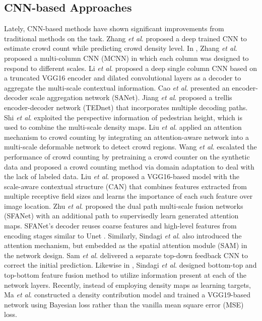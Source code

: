 \documentclass[10pt, conference, a4paper]{IEEEtran}
\begin{document}
\subsection{CNN-based Approaches}
Lately, CNN-based methods have shown significant improvements from traditional methods on the task. Zhang \textit{et al}. \cite{zhang2015cross} proposed a deep trained CNN to estimate crowd count while predicting crowd density level. In \cite{zhang2016single}, Zhang \textit{et al}. proposed a multi-column CNN (MCNN) in which each column was designed to respond to different scales. Li \textit{et al}. \cite{li2018csrnet} proposed a deep single column CNN based on a truncated VGG16 encoder and dilated convolutional layers as a decoder to aggregate the multi-scale contextual information. Cao \textit{et al}. \cite{cao2018scale} presented an encoder-decoder scale aggregation network (SANet). Jiang \textit{et al}. \cite{jiang2019crowd} proposed a trellis encoder-decoder network (TEDnet) that incorporates multiple decoding paths. Shi \textit{et al}. \cite{shi2019revisiting} exploited the perspective information of pedestrian height, which is used to combine the multi-scale density maps. Liu \textit{et al}. \cite{liu2019adcrowdnet} applied an attention mechanism to crowd counting by integrating an attention-aware network into a multi-scale deformable network to detect crowd regions. Wang \textit{et al}. \cite{wang2019learning} escalated the performance of crowd counting by pretraining a crowd counter on the synthetic data and proposed a crowd counting method via domain adaptation to deal with the lack of labeled data. Liu \textit{et al}. \cite{liu2019context} proposed a VGG16-based model with the scale-aware contextual structure (CAN) that combines features extracted from multiple receptive field sizes and learns the importance of each such feature over image location. Zhu \textit{et al}. \cite{zhu2019dual} proposed the dual path multi-scale fusion networks (SFANet) with an additional path to supervisedly learn generated attention maps. SFANet's decoder reuses coarse features and high-level features from encoding stages similar to Unet \cite{ronneberger2015u}. Similarly, Sindagi \textit{et al}. \cite{sindagi2019ha} also introduced the attention mechanism, but embedded as the spatial attention module (SAM) in the network design. Sam \textit{et al}. \cite{sam2018top} delivered a separate top-down feedback CNN to correct the initial prediction. Likewise in \cite{sindagi2019multi}, Sindagi \textit{et al}. designed bottom-top and top-bottom feature fusion method to utilize information present at each of the network layers. Recently, instead of employing density maps as learning targets, Ma \textit{et al}. \cite{ma2019bayesian} constructed a density contribution model and trained a VGG19\cite{simonyan2014very}-based network using Bayesian loss rather than the vanilla mean square error (MSE) loss.
\label{related_work_para}
\end{document}
